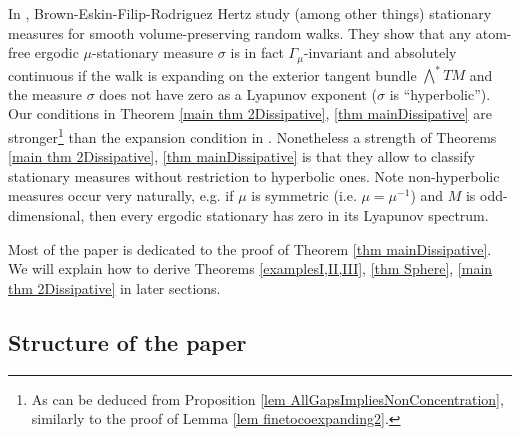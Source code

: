 \documentclass[11pt, leqno, fleqn]{amsart}
\theoremstyle{definition}
\theoremstyle{definition}
\begin{document}
In \cite{BEFRH}, Brown-Eskin-Filip-Rodriguez Hertz study (among other things) stationary measures for smooth volume-preserving random walks. They show that any atom-free ergodic $\mu$-stationary measure $\sigma$ is in fact $\Gamma_{\mu}$-invariant and absolutely continuous 
if the walk is expanding  on the exterior  tangent bundle $\bigwedge^*TM$ \cite[Def 1.1.3]{BEFRH} and the measure $\sigma$ does not have  zero as a Lyapunov exponent ($\sigma$ is ``hyperbolic''). 
Our conditions in Theorem  \ref{main thm 2Dissipative},  \ref{thm mainDissipative} are stronger\footnote{As can be deduced from Proposition \ref{lem AllGapsImpliesNonConcentration}, similarly to the proof of Lemma \ref{lem finetocoexpanding2}.} than the expansion condition in \cite{BEFRH}.
Nonetheless a strength of Theorems \ref{main thm 2Dissipative}, \ref{thm mainDissipative} is that they allow to classify stationary measures without restriction to hyperbolic ones.  
Note non-hyperbolic measures occur very naturally, e.g. if $\mu$ is symmetric (i.e. $\mu=\mu^{-1}$) and $M$ is odd-dimensional, then every ergodic stationary has zero in its Lyapunov spectrum.
\bigskip







Most of the paper is dedicated to the proof  of Theorem  \ref{thm mainDissipative}. We will  explain how to derive Theorems  \ref{examplesI,II,III}, \ref{thm Sphere},  \ref{main thm 2Dissipative} in later sections.



\subsection{Structure of the paper}
\end{document}
